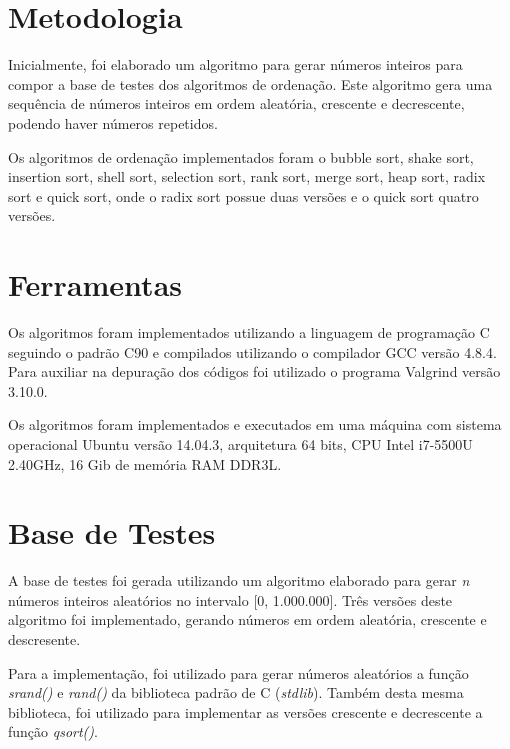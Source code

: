 \documentclass[fleqn,10pt]{SelfArx} %
\begin{document}

\section{Metodologia}

Inicialmente, foi elaborado um algoritmo para gerar números inteiros para compor a base de testes dos algoritmos de 
ordenação. Este algoritmo gera uma sequência de números inteiros em ordem aleatória, crescente e decrescente, podendo 
haver números repetidos.

Os algoritmos de ordenação implementados foram o bubble sort, shake sort, insertion sort, shell sort, selection sort, 
rank sort, merge sort, heap sort, radix sort e quick sort, onde o radix sort possue duas versões e o quick sort 
quatro versões. 


\section{Ferramentas}

Os algoritmos foram implementados utilizando a linguagem de programação C seguindo o padrão C90 e 
compilados utilizando o compilador GCC versão 4.8.4. Para auxiliar na depuração dos códigos foi utilizado o 
programa Valgrind versão 3.10.0. 

Os algoritmos foram implementados e executados em uma máquina com sistema operacional Ubuntu versão 14.04.3, 
arquitetura 64 bits, CPU Intel i7-5500U 2.40GHz, 16 Gib de memória RAM DDR3L.


\section{Base de Testes}

A base de testes foi gerada utilizando um algoritmo elaborado para gerar \emph{n} números inteiros aleatórios no intervalo 
[0, 1.000.000]. Três versões deste algoritmo foi implementado, gerando números em ordem aleatória, crescente e descresente.

Para a implementação, foi utilizado para gerar números aleatórios a função \emph{srand()} e \emph{rand()} da biblioteca 
padrão de C (\emph{stdlib}). Também desta mesma biblioteca, foi utilizado para implementar as versões crescente e 
decrescente a função \emph{qsort()}.
\end{document}
